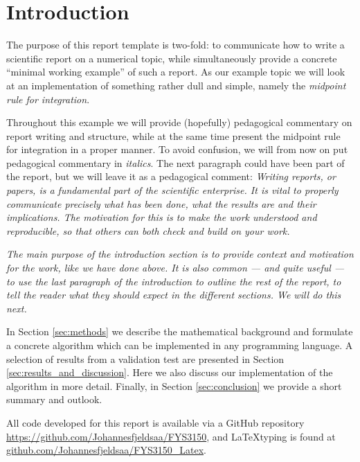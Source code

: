 \documentclass[../main_proj3.tex]{subfiles}
\begin{document}
\section{Introduction}

The purpose of this report template is two-fold: to communicate how to write a scientific report on a numerical topic, while simultaneously provide a concrete ``minimal working example'' of such a report. As our example topic we will look at an implementation of something rather dull and simple, namely the \textit{midpoint rule for integration}.

Throughout this example we will provide (hopefully) pedagogical commentary on report writing and structure, while at the same time present the midpoint rule for integration in a proper manner. To avoid confusion, we will from now on put pedagogical commentary in \textit{italics}. The next paragraph could have been part of the report, but we will leave it as a pedagogical comment: \textit{Writing reports, or papers, is a fundamental part of the scientific enterprise. It is vital to properly communicate precisely what has been done, what the results are and their implications. The motivation for this is to make the work understood and reproducible, so that others can both check and build on your work.}

\textit{The main purpose of the introduction section is to provide context and motivation for the work, like we have done above. It is also common --- and quite useful --- to use the last paragraph of the introduction to outline the rest of the report, to tell the reader what they should expect in the different sections. We will do this next.}

In Section \ref{sec:methods} we describe the mathematical background and formulate a concrete algorithm which can be implemented in any programming language. A selection of results from a validation test are presented in Section \ref{sec:results_and_discussion}. Here we also discuss our implementation of the algorithm in more detail. Finally, in Section \ref{sec:conclusion} we provide a short summary and outlook. 

All code developed for this report is available via a GitHub repository \href{github.com/Johannesfjeldsaa/FYS3150}{https://github.com/Johannesfjeldsaa/FYS3150}, and \LaTeX typing is found at \href{https://github.com/Johannesfjeldsaa/FYS3150_Latex}{github.com/Johannesfjeldsaa/FYS3150\_Latex}. 
\end{document}

